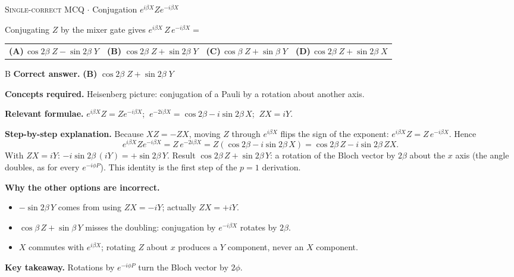 \documentclass[11pt,a4paper]{article}
\newcommand{\optlabel}[1]{\textbf{(#1)}}
\newcommand{\correctlabel}[1]{\textcolor{okgreen}{\textbf{(#1)}\,\ding{51}}}
\newenvironment{qitem}[1]{\begin{list}{}{\setlength{\leftmargin}{3.3em}\setlength{\labelwidth}{3.1em}%
  \setlength{\labelsep}{0.2em}\setlength{\topsep}{3pt}\setlength{\parsep}{3pt}}\item[\textbf{Q.#1}\hfill]}{\end{list}}
\newcommand{\qsep}{\par\vspace{2pt}{\color{black!15}\hrule}\vspace{4pt}}
\newcommand{\qmeta}[2]{{\footnotesize\color{black!60}\textsc{#1} \;$\cdot$\; #2}\par}
\begin{document}
\begin{qitem}{31}
\qmeta{Single-correct MCQ}{Conjugation $e^{i\beta X}Ze^{-i\beta X}$}
Conjugating $Z$ by the mixer gate gives $e^{i\beta X}\,Z\,e^{-i\beta X} =$
\par\smallskip\noindent\begin{tabularx}{\linewidth}{@{}*{4}{L}@{}}
\optlabel{A}\,$\cos 2\beta\; Z - \sin 2\beta\; Y$ & \correctlabel{B}\,$\cos 2\beta\; Z + \sin 2\beta\; Y$ & \optlabel{C}\,$\cos\beta\; Z + \sin\beta\; Y$ & \optlabel{D}\,$\cos 2\beta\; Z + \sin 2\beta\; X$
\end{tabularx}
\end{qitem}
\begin{solbox}{B}
\textbf{\color{brand}Correct answer.} \textcolor{okgreen}{\textbf{(B)}} $\cos 2\beta\; Z + \sin 2\beta\; Y$

\textbf{\color{brand}Concepts required.} Heisenberg picture: conjugation of a Pauli by a rotation about another axis.

\textbf{\color{brand}Relevant formulae.} $e^{i\beta X}Z = Ze^{-i\beta X}$; $\ e^{-2i\beta X} = \cos2\beta - i\sin2\beta\,X$; $\ ZX = iY$.

\textbf{\color{brand}Step-by-step explanation.} Because $XZ = -ZX$, moving $Z$ through $e^{i\beta X}$ flips the sign of the exponent: $e^{i\beta X}Z = Z\,e^{-i\beta X}$. Hence
\[ e^{i\beta X}Ze^{-i\beta X} = Z\,e^{-2i\beta X} = Z(\cos 2\beta - i\sin 2\beta\, X) = \cos2\beta\, Z - i\sin2\beta\, ZX . \]
With $ZX = iY$: $-i\sin2\beta\,(iY) = +\sin 2\beta\, Y$. Result $\cos2\beta\,Z + \sin2\beta\,Y$: a rotation of the Bloch vector by $2\beta$
about the $x$ axis (the angle doubles, as for every $e^{-i\phi P}$). This identity is the first step of the $p = 1$ derivation.

\textbf{\color{brand}Why the other options are incorrect.}
\begin{itemize}[leftmargin=2.4em, itemsep=1pt, topsep=2pt]
\item[\textbf{(A)}] $-\sin2\beta\,Y$ comes from using $ZX = -iY$; actually $ZX = +iY$.
\item[\textbf{(C)}] $\cos\beta\,Z + \sin\beta\,Y$ misses the doubling: conjugation by $e^{-i\beta X}$ rotates by $2\beta$.
\item[\textbf{(D)}] $X$ commutes with $e^{i\beta X}$; rotating $Z$ about $x$ produces a $Y$ component, never an $X$ component.
\end{itemize}
\textbf{\color{brand}Key takeaway.} Rotations by $e^{-i\phi P}$ turn the Bloch vector by $2\phi$.
\end{solbox}
\qsep
\end{document}
